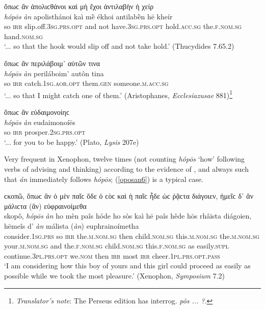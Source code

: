 \begin{exe}
\ex ὅπωϲ ἂν ἀπολιϲθάνοι καὶ μὴ ἔχοι ἀντιλαβὴν ἡ χείρ\\
\gll \emph{hópōs} \emph{àn} apolisthánoi kaì mḕ ékhoi antilabḕn hē kheír\\
so \textsc{irr} slip.off.\textsc{3sg.prs.opt} and not have.\textsc{3sg.prs.opt} hold.\textsc{acc.sg} the.\textsc{f.nom.sg} hand.\textsc{nom.sg}\\
\trans `... so that the hook would slip off and not take hold.' (Thucydides 7.65.2)
\label{oposan3}
\end{exe}

\newpage
\begin{exe}
\ex ὅπωϲ ἂν περιλάβοιμ᾽ αὐτῶν τινα\\
\gll \emph{hópōs} \emph{àn} periláboim' autôn tina\\
so \textsc{irr} catch.\textsc{1sg.aor.opt} them.\textsc{gen}
someone.\textsc{m.acc.sg}\\
\trans `... so that I might catch one of them.' (Aristophanes, \textit{Ecclesiazusae} 881)\footnote{\emph{Translator's note}: The Perseus edition has interrog. \textit{pôs ... ?}.}
\label{oposan4}
\end{exe}

\begin{exe}
\ex ὅπωϲ ἂν εὐδαιμονοίηϲ\\
\gll \emph{hópōs} \emph{àn} eudaimonoíēs\\
so \textsc{irr} prosper.\textsc{2sg.prs.opt}\\
\trans `... for you to be happy.' (Plato, \textit{Lysis} 207e)
\label{oposan5}
\end{exe}

Very frequent in Xenophon, twelve times (not counting \emph{hópōs} `how' following verbs of advising and thinking) according to the evidence of \citet[83ff.]{Weber1885}, and always such that \emph{án} immediately follows \emph{hópōs}; (\ref{oposan6}) is a typical case.

\begin{exe}
\ex ϲκοπῶ, ὅπωϲ ἂν ὁ μὲν παῖϲ ὅδε ὁ ϲὸϲ καὶ ἡ παῖϲ ἧδε ὡϲ ῥᾷϲτα
διάγοιεν, ἡμεῖϲ δ᾽ ἂν μάλιϲτα (ἂν) εὐφραινοίμεθα\\
\gll skopô, \emph{hópōs} \emph{àn} ho mèn paîs hóde ho sòs kaì hē paîs hêde hōs rhâista diágoien, hēmeîs d' \emph{àn} málista (\emph{àn}) euphrainoímetha\\
consider.\textsc{1sg.prs} so \textsc{irr} the.\textsc{m.nom.sg} then child.\textsc{nom.sg} this.\textsc{m.nom.sg} the.\textsc{m.nom.sg} your.\textsc{m.nom.sg} and the.\textsc{f.nom.sg} child.\textsc{nom.sg} this.\textsc{f.nom.sg} as easily.\textsc{supl} continue.\textsc{3pl.prs.opt} we.\textsc{nom} then \textsc{irr} most \textsc{irr} cheer.\textsc{1pl.prs.opt.pass}\\
\trans `I am considering how this boy of yours and this girl could proceed as easily as possible while we took the most pleasure.' (Xenophon, \textit{Symposium} 7.2)
\label{oposan6}
\end{exe}

